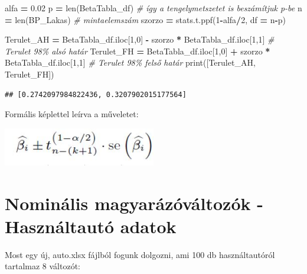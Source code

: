 \documentclass[
]{book}
\newenvironment{Shaded}{\begin{snugshade}}{\end{snugshade}}
\newcommand{\BuiltInTok}[1]{#1}
\newcommand{\CommentTok}[1]{\textcolor[rgb]{0.56,0.35,0.01}{\textit{#1}}}
\newcommand{\DecValTok}[1]{\textcolor[rgb]{0.00,0.00,0.81}{#1}}
\newcommand{\FloatTok}[1]{\textcolor[rgb]{0.00,0.00,0.81}{#1}}
\newcommand{\NormalTok}[1]{#1}
\newcommand{\OperatorTok}[1]{\textcolor[rgb]{0.81,0.36,0.00}{\textbf{#1}}}
\begin{document}
\begin{Shaded}
\begin{Highlighting}[]
\NormalTok{alfa }\OperatorTok{=} \FloatTok{0.02}
\NormalTok{p }\OperatorTok{=} \BuiltInTok{len}\NormalTok{(BetaTabla\_df) }\CommentTok{\# így a tengelymetszetet is beszámítjuk p{-}be}
\NormalTok{n }\OperatorTok{=} \BuiltInTok{len}\NormalTok{(BP\_Lakas) }\CommentTok{\# mintaelemszám}
\NormalTok{szorzo }\OperatorTok{=}\NormalTok{ stats.t.ppf(}\DecValTok{1}\OperatorTok{{-}}\NormalTok{alfa}\OperatorTok{/}\DecValTok{2}\NormalTok{, df }\OperatorTok{=}\NormalTok{ n}\OperatorTok{{-}}\NormalTok{p)}

\NormalTok{Terulet\_AH }\OperatorTok{=}\NormalTok{ BetaTabla\_df.iloc[}\DecValTok{1}\NormalTok{,}\DecValTok{0}\NormalTok{] }\OperatorTok{{-}}\NormalTok{ szorzo }\OperatorTok{*}\NormalTok{ BetaTabla\_df.iloc[}\DecValTok{1}\NormalTok{,}\DecValTok{1}\NormalTok{] }\CommentTok{\# Terulet 98\% alsó határ}
\NormalTok{Terulet\_FH }\OperatorTok{=}\NormalTok{ BetaTabla\_df.iloc[}\DecValTok{1}\NormalTok{,}\DecValTok{0}\NormalTok{] }\OperatorTok{+}\NormalTok{ szorzo }\OperatorTok{*}\NormalTok{ BetaTabla\_df.iloc[}\DecValTok{1}\NormalTok{,}\DecValTok{1}\NormalTok{] }\CommentTok{\# Terulet 98\% felső határ}
\BuiltInTok{print}\NormalTok{([Terulet\_AH, Terulet\_FH])}
\end{Highlighting}
\end{Shaded}

\begin{verbatim}
## [0.2742097984822436, 0.3207902015177564]
\end{verbatim}

Formális képlettel leírva a műveletet:

\includegraphics[width=0.5\textwidth,height=\textheight]{BetaCI.jpg}

\section{Nominális magyarázóváltozók - Használtautó adatok}\label{nominuxe1lis-magyaruxe1zuxf3vuxe1ltozuxf3k---hasznuxe1ltautuxf3-adatok}

Most egy új, auto.xlsx fájlból fogunk dolgozni, ami 100 db használtautóról tartalmaz 8 változót:
\end{document}
